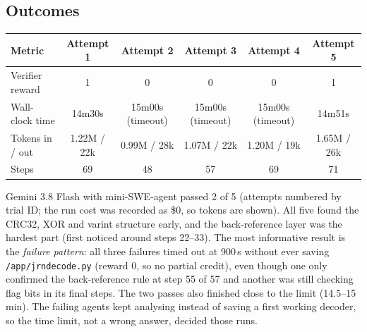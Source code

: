 \documentclass[11pt]{article}
\begin{document}
\subsection*{Outcomes}
\vspace{-4pt}
\begin{center}
\renewcommand{\arraystretch}{1.15}
\begin{tabularx}{\linewidth}{>{\raggedright\arraybackslash}Xccccc}
  \toprule
  Metric & Attempt 1 & Attempt 2 & Attempt 3 & Attempt 4 & Attempt 5 \\
  \midrule
  Verifier reward & 1 & 0 & 0 & 0 & 1 \\
  Wall-clock time & 14m30s & 15m00s (timeout) & 15m00s (timeout) & 15m00s (timeout) & 14m51s \\
  Tokens in / out & 1.22M / 22k & 0.99M / 28k & 1.07M / 22k & 1.20M / 19k & 1.65M / 26k \\
  Steps & 69 & 48 & 57 & 69 & 71 \\
  \bottomrule
\end{tabularx}
\end{center}
\vspace{4pt}
Gemini 3.8 Flash with mini-SWE-agent passed 2 of 5 (attempts numbered by trial ID; the run cost was recorded as \$0, so tokens are shown).
All five found the CRC32, XOR and varint structure early, and the back-reference layer was the hardest part (first noticed around steps 22--33).
The most informative result is the \emph{failure pattern}: all three failures timed out at 900\,s without ever saving \texttt{/app/jrndecode.py} (reward 0, so no partial credit),
even though one only confirmed the back-reference rule at step 55 of 57 and another was still checking flag bits in its final steps. The two passes also finished close to the limit (14.5--15 min).
The failing agents kept analysing instead of saving a first working decoder, so the time limit, not a wrong answer, decided those runs.
\end{document}
